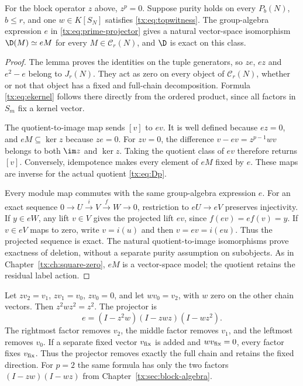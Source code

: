 \begin{proposition}\label{tx:prop:prime-exactness}
For the block operator $z$ above, $z^p=0$. Suppose purity holds on
every $P_b(N)$, $b\le r$, and one
$w\in K[S_N]$ satisfies \eqref{tx:eq:topwitness}. The group-algebra
expression $e$ in \eqref{tx:eq:prime-projector} gives a natural
vector-space isomorphism $\D(M)\simeq eM$ for every
$M\in\mathcal C_r(N)$, and $\D$ is exact on this class.
\end{proposition}
\begin{proof}
The lemma proves the identities on the tuple generators, so $ze$, $ez$
and $e^2-e$ belong to $J_r(N)$. They act as zero on every object of
$\mathcal C_r(N)$, whether or not that object has a fixed and full-chain
decomposition. Formula \eqref{tx:eq:ekernel} follows there directly from
the ordered product, since all factors in $S_m$ fix a kernel vector.

The quotient-to-image map sends $[v]$ to $ev$. It is well defined
because $ez=0$, and $eM\subseteq\ker z$ because $ze=0$.
For $zv=0$, the difference $v-ev=z^{p-1}wv$ belongs to both
$\im z$ and $\ker z$. Taking the quotient class of $ev$ therefore
returns $[v]$. Conversely, idempotence makes every element of $eM$
fixed by $e$. These maps are inverse for the actual quotient
\eqref{tx:eq:Dp}.

Every module map commutes with the same group-algebra expression $e$.
For an exact sequence $0\to U\xrightarrow{i}V\xrightarrow{f}W\to0$,
restriction to $eU\to eV$ preserves injectivity. If $y\in eW$, any
lift $v\in V$ gives the projected lift $ev$, since $f(ev)=ef(v)=y$.
If $v\in eV$ maps to zero, write $v=i(u)$ and then
$v=ev=i(eu)$. Thus the projected sequence is exact. The natural
quotient-to-image isomorphisms prove exactness of deletion, without a
separate purity assumption on subobjects. As in
Chapter~\ref{tx:ch:square-zero}, $eM$ is a vector-space model;
the quotient retains the residual label action.
\end{proof}

\begin{example}
Let $zv_2=v_1$, $zv_1=v_0$, $zv_0=0$, and let $wv_0=v_2$, with $w$ zero on the other chain vectors. Then $z^2wz^2=z^2$. The projector is
\[e=(I-z^2w)(I-zwz)(I-wz^2).
\]
The rightmost factor removes $v_2$, the middle factor removes $v_1$, and the leftmost removes $v_0$. If a separate fixed vector $v_{\rm fix}$ is added and $wv_{\rm fix}=0$, every factor fixes $v_{\rm fix}$. Thus the projector removes exactly the full chain and retains the fixed direction. For $p=2$ the same formula has only the two factors $(I-zw)(I-wz)$ from Chapter~\ref{tx:sec:block-algebra}.
\end{example}

